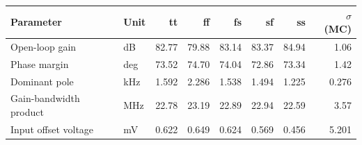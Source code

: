 \begin{tabular}{@{}llrrrrrr@{}}
\toprule
Parameter & Unit & tt & ff & fs & sf & ss & $\sigma$ (MC) \\
\midrule
Open-loop gain & dB & 82.77 & 79.88 & 83.14 & 83.37 & 84.94 & 1.06 \\
Phase margin & deg & 73.52 & 74.70 & 74.04 & 72.86 & 73.34 & 1.42 \\
Dominant pole & kHz & 1.592 & 2.286 & 1.538 & 1.494 & 1.225 & 0.276 \\
Gain-bandwidth product & MHz & 22.78 & 23.19 & 22.89 & 22.94 & 22.59 & 3.57 \\
Input offset voltage & mV & 0.622 & 0.649 & 0.624 & 0.569 & 0.456 & 5.201 \\
\bottomrule
\end{tabular}
